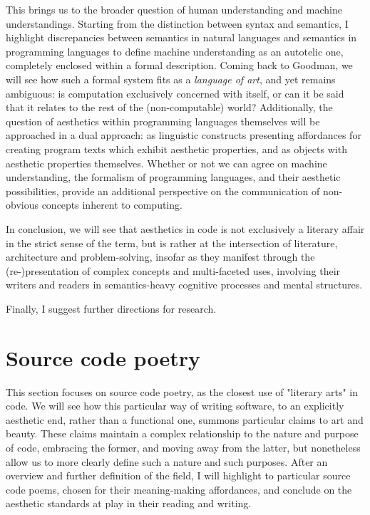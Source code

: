 \documentclass{article}
\begin{document}
This brings us to the broader question of human understanding and machine understandings. Starting from the distinction between syntax and semantics, I highlight discrepancies between semantics in natural languages and semantics in programming languages to define machine understanding as an autotelic one, completely enclosed within a formal description. Coming back to Goodman, we will see how such a formal system fits as a \emph{language of art}, and yet remains ambiguous: is computation exclusively concerned with itself, or can it be said that it relates to the rest of the (non-computable) world? Additionally, the question of aesthetics within programming languages themselves will be approached in a dual approach: as linguistic constructs presenting affordances for creating program texts which exhibit aesthetic properties, and as objects with aesthetic properties themselves. Whether or not we can agree on machine understanding, the formalism of programming languages, and their aesthetic possibilities, provide an additional perspective on the communication of non-obvious concepts inherent to computing.

In conclusion, we will see that aesthetics in code is not exclusively a literary affair in the strict sense of the term, but is rather at the intersection of literature, architecture and problem-solving, insofar as they manifest through the (re-)presentation of complex concepts and multi-faceted uses, involving their writers and readers in semantics-heavy cognitive processes and mental structures.

Finally, I suggest further directions for research.

\section{Source code poetry}

This section focuses on source code poetry, as the closest use of "literary arts" in code. We will see how this particular way of writing software, to an explicitly aesthetic end, rather than a functional one, summons particular claims to art and beauty. These claims maintain a complex relationship to the nature and purpose of code, embracing the former, and moving away from the latter, but nonetheless allow us to more clearly define such a nature and such purposes. After an overview and further definition of the field, I will highlight to particular source code poems, chosen for their meaning-making affordances, and conclude on the aesthetic standards at play in their reading and writing.
\end{document}
